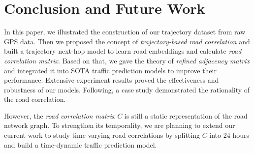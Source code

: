 
\section{Conclusion and Future Work}
In this paper, we illustrated the construction of our trajectory dataset from raw GPS data. Then we proposed the concept of \textit{trajectory-based road correlation} and built a trajectory next-hop model to learn road embeddings and calculate \textit{road correlation matrix}. Based on that, we gave the theory of \textit{refined adjacency matrix} and integrated it into SOTA traffic prediction models to improve their performance. Extensive experiment results proved the effectiveness and robustness of our models. Following, a case study demonstrated the rationality of the road correlation.

However, the \textit{road correlation matrix} $C$ is still a static representation of the road network graph. To strengthen its temporality, we are planning to extend our current work to study time-varying road correlations by splitting $C$ into 24 hours and build a time-dynamic traffic prediction model.
